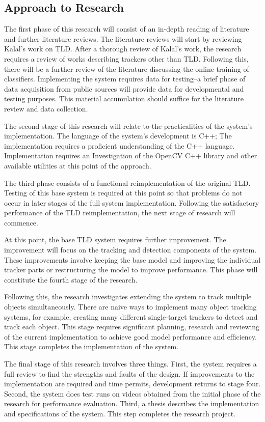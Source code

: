 \subsection{Approach to Research}
  The first phase of this research will consist of an in-depth reading of literature and further literature reviews.
  The literature reviews will start by reviewing Kalal's work on TLD.
  After a thorough review of Kalal's work, the research requires a review of works describing trackers other than TLD.
  Following this, there will be a further review of the literature discussing the online training of classifiers.
  Implementing the system requires data for testing--a brief phase of data acquisition from public sources will provide data for developmental and testing purposes.
  This material accumulation should suffice for the literature review and data collection.

  The second stage of this research will relate to the practicalities of the system's implementation.
  The language of the system's development is C++; The implementation requires a proficient understanding of the C++ language.
  Implementation requires an Investigation of the OpenCV C++ library and other available utilities at this point of the approach.

  The third phase consists of a functional reimplementation of the original TLD.
  Testing of this base system is required at this point so that problems do not occur in later stages of the full system implementation.
  Following the satisfactory performance of the TLD reimplementation, the next stage of research will commence.

  At this point, the base TLD system requires further improvement.
  The improvement will focus on the tracking and detection components of the system. 
  These improvements involve keeping the base model and improving the individual tracker parts or restructuring the model to improve performance.
  This phase will constitute the fourth stage of the research.

  Following this, the research investigates extending the system to track multiple objects simultaneously.
  There are naive ways to implement many object tracking systems, for example, creating many different single-target trackers to detect and track each object. 
  This stage requires significant planning, research and reviewing of the current implementation to achieve good model performance and efficiency.
  This stage completes the implementation of the system.

  The final stage of this research involves three things.
  First, the system requires a full review to find the strengths and faults of the design.
  If improvements to the implementation are required and time permits, development returns to stage four.
  Second, the system does test runs on videos obtained from the initial phase of the research for performance evaluation.
  Third, a thesis describes the implementation and specifications of the system.
  This step completes the research project.
